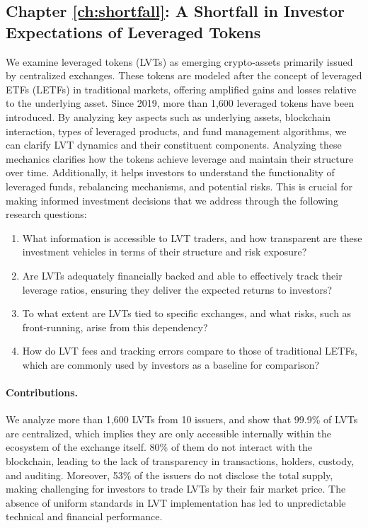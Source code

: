 \subsection*{Chapter \ref{ch:shortfall}: A Shortfall in Investor Expectations of Leveraged Tokens}
We examine leveraged tokens (LVTs) as emerging crypto-assets primarily issued by centralized exchanges. These tokens are modeled after the concept of leveraged ETFs (LETFs) in traditional markets, offering amplified gains and losses relative to the underlying asset. Since 2019, more than 1,600 leveraged tokens have been introduced. By analyzing key aspects such as underlying assets, blockchain interaction, types of leveraged products, and fund management algorithms, we can clarify LVT dynamics and their constituent components. Analyzing these mechanics clarifies how the tokens achieve leverage and maintain their structure over time. Additionally, it helps investors to understand the functionality of leveraged funds, rebalancing mechanisms, and potential risks. This is crucial for making informed investment decisions that we address through the following research questions:
\begin{enumerate}[label={(RQ3.\arabic*)},leftmargin=*]
	\item What information is accessible to LVT traders, and how transparent are these investment vehicles in terms of their structure and risk exposure?
	\item  Are LVTs adequately financially backed and able to effectively track their leverage ratios, ensuring they deliver the expected returns to investors?
	\item To what extent are LVTs tied to specific exchanges, and what risks, such as front-running, arise from this dependency?
	\item How do LVT fees and tracking errors compare to those of traditional LETFs, which are commonly used by investors as a baseline for comparison?
\end{enumerate}
\paragraph{Contributions.} We analyze more than 1,600 LVTs from 10 issuers, and show that 99.9\% of LVTs are centralized, which implies they are only accessible internally within the ecosystem of the exchange itself. 80\% of them do not interact with the blockchain, leading to the lack of transparency in transactions, holders, custody, and auditing. Moreover, 53\% of the issuers do not disclose the total supply, making challenging for investors to trade LVTs by their fair market price. The absence of uniform standards in LVT implementation has led to unpredictable technical and financial performance. 

